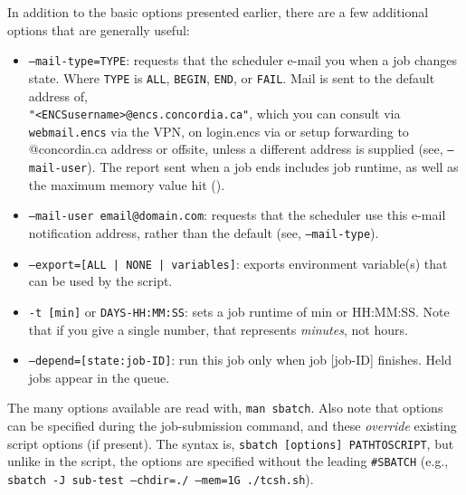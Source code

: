 In addition to the basic  options presented earlier, there are a 
few additional options that are generally useful:

\begin{itemize}
\item
\texttt{--mail-type=TYPE}: requests that the scheduler e-mail you when a job changes
state. Where \texttt{TYPE} is \texttt{ALL}, \texttt{BEGIN}, \texttt{END}, or \texttt{FAIL}.
Mail is sent to the default address of, \\
\texttt{"<ENCSusername>@encs.concordia.ca"}, which you can consult
via \texttt{webmail.encs} via the VPN, on login.encs via 
or setup forwarding to @concordia.ca address or offsite,
unless a different address is supplied (see, \texttt{--mail-user}).
The report sent when a job ends includes job 
runtime, as well as the maximum memory value hit (). 

\item
\texttt{--mail-user email@domain.com}: requests that the scheduler use this e-mail 
notification address, rather than the default (see, \texttt{--mail-type}). 

\item
\texttt{--export=[ALL | NONE | variables]}: exports environment variable(s) that can be used by the script.

\item
\texttt{-t [min]} or \texttt{DAYS-HH:MM:SS}: sets a job runtime of min or HH:MM:SS. Note 
that if you give a single number, that represents \emph{minutes}, not hours. 

\item
\texttt{--depend=[state:job-ID]}: run this job only when job [job-ID] finishes. Held jobs appear in the queue. 

\end{itemize}

The many  options available are read with, \texttt{man sbatch}. Also 
note that  options can be specified during the job-submission 
command, and these \emph{override} existing script options (if present). The 
syntax is, \texttt{sbatch [options] PATHTOSCRIPT}, but unlike in the script, 
the options are specified without the leading \verb+#SBATCH+
(e.g., \texttt{sbatch -J sub-test --chdir=./ --mem=1G ./tcsh.sh}).